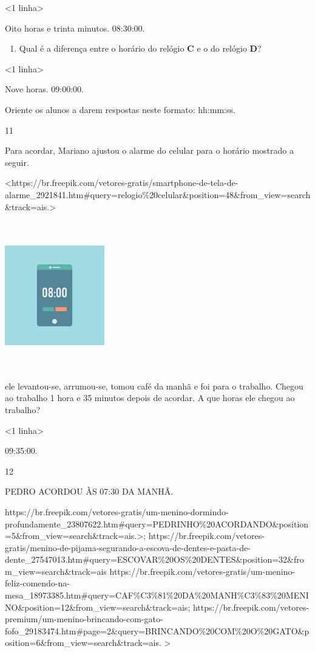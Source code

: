 \textless{}1 linha\textgreater{}

Oito horas e trinta minutos. 08:30:00.

\begin{enumerate}
\def\labelenumi{\Alph{enumi})}
\item
  Qual é a diferença entre o horário do relógio \textbf{C} e o do relógio \textbf{D}?
\end{enumerate}

\textless{}1 linha\textgreater{}

Nove horas. 09:00:00.

Oriente os alunos a darem respostas neste formato: hh:mm:ss.

\num{11}

Para acordar, Mariano ajustou o alarme do celular para o horário mostrado a seguir.

\textless{}https://br.freepik.com/vetores-gratis/smartphone-de-tela-de-alarme\_2921841.htm\#query=relogio\%20celular\&position=48\&from\_view=search\&track=ais.\textgreater{}

\includegraphics[width=1.70922in,height=2.53170in]{media/image39.jpg}

ele levantou-se, arrumou-se, tomou café da manhã e foi para o trabalho. Chegou ao trabalho 1 hora e 35 minutos depois de acordar. A que horas ele chegou ao trabalho?

\textless{}1 linha\textgreater{}

09:35:00.

\num{12}

PEDRO ACORDOU ÀS 07:30 DA MANHÃ.

https://br.freepik.com/vetores-gratis/um-menino-dormindo-profundamente\_23807622.htm\#query=PEDRINHO\%20ACORDANDO\&position=5\&from\_view=search\&track=ais.\textgreater{};
https://br.freepik.com/vetores-gratis/menino-de-pijama-segurando-a-escova-de-dentes-e-pasta-de-dente\_27547013.htm\#query=ESCOVAR\%20OS\%20DENTES\&position=32\&from\_view=search\&track=ais
https://br.freepik.com/vetores-gratis/um-menino-feliz-comendo-na-mesa\_18973385.htm\#query=CAF\%C3\%81\%20DA\%20MANH\%C3\%83\%20MENINO\&position=12\&from\_view=search\&track=ais;
https://br.freepik.com/vetores-premium/um-menino-brincando-com-gato-fofo\_29183474.htm\#page=2\&query=BRINCANDO\%20COM\%20O\%20GATO\&position=6\&from\_view=search\&track=ais.
\textgreater{}

